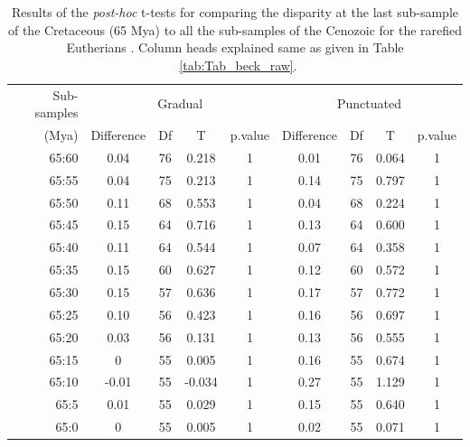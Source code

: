 \documentclass[12pt,letterpaper]{article}
\begin{document}
\begin{table}[ht]
\caption{Results of the \textit{post-hoc} t-tests for comparing the disparity at the last sub-sample of the Cretaceous (65 Mya) to all the sub-samples of the Cenozoic for the rarefied Eutherians \citep[data from][]{beckancient2014}. Column heads explained same as given in Table ~\ref{tab:Tab_beck_raw}.}
\label{tab:Tab_beck_rar}
\centering
\begin{tabular}{r|cccc|cccc}
  \hline
  Sub-samples & \multicolumn{4}{c|}{Gradual} & \multicolumn{4}{c}{Punctuated} \\
  (Mya) & Difference & Df & T & p.value & Difference & Df & T & p.value \\ 
  \hline
  65:60 & 0.04  & 76 & 0.218  & 1 & 0.01 & 76 & 0.064 & 1 \\ 
  65:55 & 0.04  & 75 & 0.213  & 1 & 0.14 & 75 & 0.797 & 1 \\ 
  65:50 & 0.11  & 68 & 0.553  & 1 & 0.04 & 68 & 0.224 & 1 \\ 
  65:45 & 0.15  & 64 & 0.716  & 1 & 0.13 & 64 & 0.600 & 1 \\ 
  65:40 & 0.11  & 64 & 0.544  & 1 & 0.07 & 64 & 0.358 & 1 \\ 
  65:35 & 0.15  & 60 & 0.627  & 1 & 0.12 & 60 & 0.572 & 1 \\ 
  65:30 & 0.15  & 57 & 0.636  & 1 & 0.17 & 57 & 0.772 & 1 \\ 
  65:25 & 0.10  & 56 & 0.423  & 1 & 0.16 & 56 & 0.697 & 1 \\ 
  65:20 & 0.03  & 56 & 0.131  & 1 & 0.13 & 56 & 0.555 & 1 \\ 
  65:15 & 0     & 55 & 0.005  & 1 & 0.16 & 55 & 0.674 & 1 \\ 
  65:10 & -0.01 & 55 & -0.034 & 1 & 0.27 & 55 & 1.129 & 1 \\ 
  65:5  & 0.01  & 55 & 0.029  & 1 & 0.15 & 55 & 0.640 & 1 \\ 
  65:0  & 0     & 55 & 0.005  & 1 & 0.02 & 55 & 0.071 & 1 \\
   \hline
\end{tabular}
\end{table}
\end{document}
